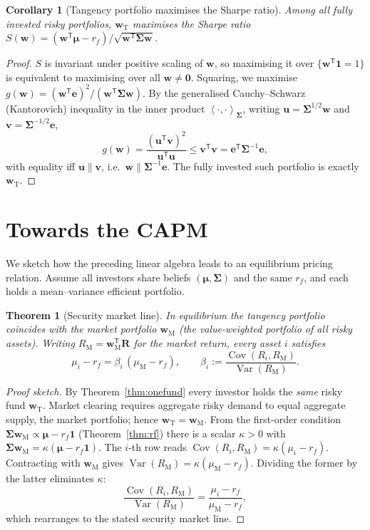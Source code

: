 \documentclass[11pt]{article}
\theoremstyle{definition}
\theoremstyle{plain}
\newtheorem{theorem}[definition]{Theorem}
\newtheorem{corollary}[definition]{Corollary}
\newcommand{\Var}{\operatorname{Var}}
\newcommand{\Cov}{\operatorname{Cov}}
\newcommand{\one}{\mathbf{1}}
\newcommand{\bw}{\bm{w}}
\newcommand{\bmu}{\bm{\mu}}
\newcommand{\bSigma}{\bm{\Sigma}}
\newcommand{\bzero}{\bm{0}}
\newcommand{\T}{^{\mathsf{T}}}
\newcommand{\inner}[2]{\left\langle #1, #2 \right\rangle}
\begin{document}
\begin{corollary}[Tangency portfolio maximises the Sharpe ratio]
Among all fully invested risky portfolios, $\bw_{\mathrm{T}}$ maximises the
Sharpe ratio $S(\bw) = (\bw\T\bmu - r_f)/\sqrt{\bw\T\bSigma\bw}$.
\end{corollary}

\begin{proof}
$S$ is invariant under positive scaling of $\bw$, so maximising it over
$\{\bw\T\one = 1\}$ is equivalent to maximising over all $\bw \ne \bzero$.
Squaring, we maximise $g(\bw) = (\bw\T\bm{e})^2 / (\bw\T\bSigma\bw)$. By the
generalised Cauchy--Schwarz (Kantorovich) inequality in the inner product
$\inner{\cdot}{\cdot}_{\bSigma}$, writing $\bm{u} = \bSigma^{1/2}\bw$ and
$\bm{v} = \bSigma^{-1/2}\bm{e}$,
\[
g(\bw) = \frac{(\bm{u}\T\bm{v})^2}{\bm{u}\T\bm{u}}
\le \bm{v}\T\bm{v} = \bm{e}\T\bSigma^{-1}\bm{e},
\]
with equality iff $\bm{u} \parallel \bm{v}$, i.e.\
$\bw \parallel \bSigma^{-1}\bm{e}$. The fully invested such portfolio is exactly
$\bw_{\mathrm{T}}$.
\end{proof}

\section{Towards the CAPM}

We sketch how the preceding linear algebra leads to an equilibrium pricing
relation. Assume all investors share beliefs $(\bmu,\bSigma)$ and the same
$r_f$, and each holds a mean--variance efficient portfolio.

\begin{theorem}[Security market line]\label{thm:capm}
In equilibrium the tangency portfolio coincides with the market portfolio
$\bw_{\mathrm{M}}$ (the value-weighted portfolio of all risky assets). Writing
$R_{\mathrm{M}} = \bw_{\mathrm{M}}\T\bm{R}$ for the market return, every asset
$i$ satisfies
\[
\mu_i - r_f = \beta_i\,(\mu_{\mathrm{M}} - r_f),
\qquad
\beta_i := \frac{\Cov(R_i, R_{\mathrm{M}})}{\Var(R_{\mathrm{M}})} .
\]
\end{theorem}

\begin{proof}[Proof sketch]
By Theorem~\ref{thm:onefund} every investor holds the \emph{same} risky fund
$\bw_{\mathrm{T}}$. Market clearing requires aggregate risky demand to equal
aggregate supply, the market portfolio; hence
$\bw_{\mathrm{T}} = \bw_{\mathrm{M}}$. From the first-order condition
$\bSigma \bw_{\mathrm{M}} \propto \bmu - r_f\one$ (Theorem~\ref{thm:rf}) there is
a scalar $\kappa > 0$ with $\bSigma\bw_{\mathrm{M}} = \kappa(\bmu - r_f\one)$.
The $i$-th row reads $\Cov(R_i, R_{\mathrm{M}}) = \kappa(\mu_i - r_f)$.
Contracting with $\bw_{\mathrm{M}}$ gives
$\Var(R_{\mathrm{M}}) = \kappa(\mu_{\mathrm{M}} - r_f)$. Dividing the former by
the latter eliminates $\kappa$:
\[
\frac{\Cov(R_i,R_{\mathrm{M}})}{\Var(R_{\mathrm{M}})}
= \frac{\mu_i - r_f}{\mu_{\mathrm{M}} - r_f},
\]
which rearranges to the stated security market line.
\end{proof}
\end{document}
